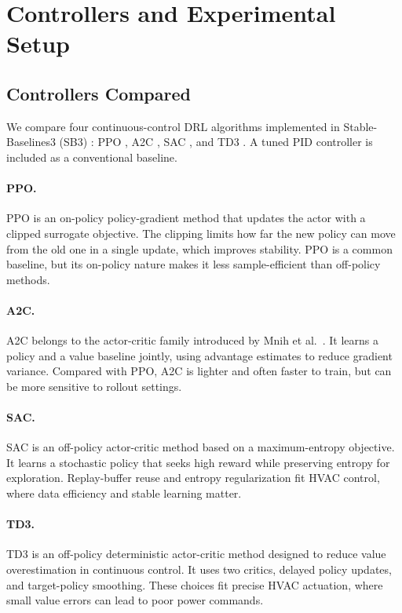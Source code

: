 \documentclass[conference]{IEEEtran}
\newcommand{\acSB}{Stable-Baselines3 (SB3)}
\begin{document}
\section{Controllers and Experimental Setup}
\label{sec:experimental-setup}

\subsection{Controllers Compared}
\label{subsec:controllers}

We compare four continuous-control DRL algorithms implemented in
\acSB{} \cite{raffin2021sb3}: PPO \cite{schulman2017ppo},
A2C \cite{mnih2016a2c}, SAC \cite{haarnoja2018sac}, and
TD3 \cite{fujimoto2018td3}. A tuned PID controller is included as a
conventional baseline.

\paragraph{PPO.}
PPO is an on-policy policy-gradient method that updates the actor with a
clipped surrogate objective. The clipping limits how far the new policy
can move from the old one in a single update, which improves stability.
PPO is a common baseline, but its on-policy nature makes it less
sample-efficient than off-policy methods.

\paragraph{A2C.}
A2C belongs to the actor-critic family introduced by Mnih et al.\
\cite{mnih2016a2c}. It learns a policy and a value baseline jointly,
using advantage estimates to reduce gradient variance. Compared with
PPO, A2C is lighter and often faster to train, but can be more sensitive
to rollout settings.

\paragraph{SAC.}
SAC is an off-policy actor-critic method based on a maximum-entropy
objective. It learns a stochastic policy that seeks high reward while
preserving entropy for exploration. Replay-buffer reuse and entropy
regularization fit HVAC control, where data efficiency and stable
learning matter.

\paragraph{TD3.}
TD3 is an off-policy deterministic actor-critic method designed to reduce
value overestimation in continuous control. It uses two critics, delayed
policy updates, and target-policy smoothing. These choices fit precise
HVAC actuation, where small value errors can lead to poor power commands.
\end{document}
